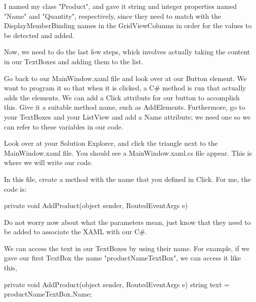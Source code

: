 \documentclass[oneside, openany] {book}
\begin{document}
I named my class "Product", and gave it string and integer properties named "Name" and "Quantity", respectively, since they need to match with the DisplayMemberBinding names in the GridViewColumns in order for the values to be detected and added.

Now, we need to do the last few steps, which involves actually taking the content in our TextBoxes and adding them to the list.

Go back to our MainWindow.xaml file and look over at our Button element. We want to program it so that when it is clicked, a C\# method is run that actually adds the elements. We can add a Click attribute for our button to accomplish this. Give it a suitable method name, such as AddElements. Furthermore, go to your TextBoxes and your ListView and add a Name attribute; we need one so we can refer to these variables in our code.

Look over at your Solution Explorer, and click the triangle next to the MainWindow.xaml file. You should see a MainWindow.xaml.cs file appear. This is where we will write our code.

In this file, create a method with the name that you defined in Click. For me, the code is: 
\begin{CSharp}
private void AddProduct(object sender, RoutedEventArgs e)
        {

        }
\end{CSharp}
Do not worry now about what the parameters mean, just know that they need to be added to associate the XAML with our C\#.

We can access the text in our TextBoxes by using their name. For example, if we gave our first TextBox the name "productNameTextBox", we can access it like this,

\begin{CSharp}
private void AddProduct(object sender, RoutedEventArgs e)
        {
            string text = productNameTextBox.Name;
        }
\end{CSharp}
\end{document}
